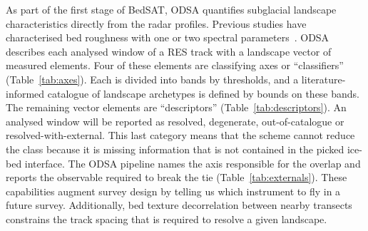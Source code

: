 As part of the first stage of BedSAT, ODSA quantifies subglacial landscape characteristics directly from the radar profiles. Previous studies have characterised bed roughness with one or two spectral parameters~\cite{Hubbard_2000, Siegert_2004, Bingham_2009, Li_2010, Rippin_2014, Jordan_2017}. ODSA describes each analysed window of a RES track  with a landscape vector of measured elements. Four of these elements are classifying axes or ``classifiers'' (Table~\ref{tab:axes}). Each is divided into bands by thresholds, and a literature-informed catalogue of landscape archetypes is defined by bounds on these bands. The remaining vector elements are ``descriptors'' (Table~\ref{tab:descriptors}). An analysed window will be reported as resolved, degenerate, out-of-catalogue or resolved-with-external. This last category means that the scheme cannot reduce the class because it is missing information that is not contained in the picked ice-bed interface. The ODSA pipeline names the axis responsible for the overlap and reports the observable required to break the tie (Table~\ref{tab:externals}). These capabilities augment survey design by telling us which instrument to fly in a future survey. Additionally, bed texture decorrelation between nearby transects constrains the track spacing that is required to resolve a given landscape. 